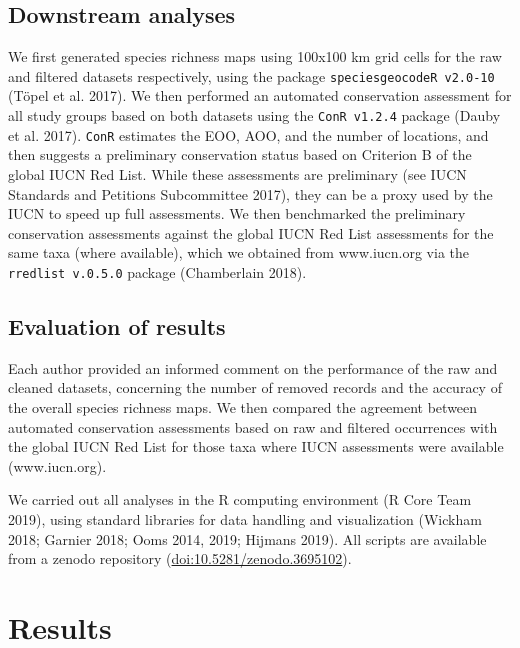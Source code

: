 \documentclass[fleqn,10pt,lineno]{wlpeerj} %
\begin{document}
\hypertarget{downstream-analyses}{%
\subsection*{Downstream analyses}\label{downstream-analyses}}

We first generated species richness maps using 100x100 km grid cells for the raw and filtered datasets respectively, using the package \texttt{speciesgeocodeR\ v2.0-10} (Töpel et al. 2017). We then performed an automated conservation assessment for all study groups based on both datasets using the \texttt{ConR\ v1.2.4} package (Dauby et al. 2017). \texttt{ConR} estimates the EOO, AOO, and the number of locations, and then suggests a preliminary conservation status based on Criterion B of the global IUCN Red List. While these assessments are preliminary (see IUCN Standards and Petitions Subcommittee 2017), they can be a proxy used by the IUCN to speed up full assessments. We then benchmarked the preliminary conservation assessments against the global IUCN Red List assessments for the same taxa (where available), which we obtained from www.iucn.org via the \texttt{rredlist\ v.0.5.0} package (Chamberlain 2018).

\hypertarget{evaluation-of-results}{%
\subsection*{Evaluation of results}\label{evaluation-of-results}}

Each author provided an informed comment on the performance of the raw and cleaned datasets, concerning the number of removed records and the accuracy of the overall species richness maps. We then compared the agreement between automated conservation assessments based on raw and filtered occurrences with the global IUCN Red List for those taxa where IUCN assessments were available (www.iucn.org).

We carried out all analyses in the R computing environment (R Core Team 2019), using standard libraries for data handling and visualization (Wickham 2018; Garnier 2018; Ooms 2014, 2019; Hijmans 2019). All scripts are available from a zenodo repository (\url{doi:10.5281/zenodo.3695102}).

\hypertarget{results}{%
\section*{Results}\label{results}}
\end{document}
